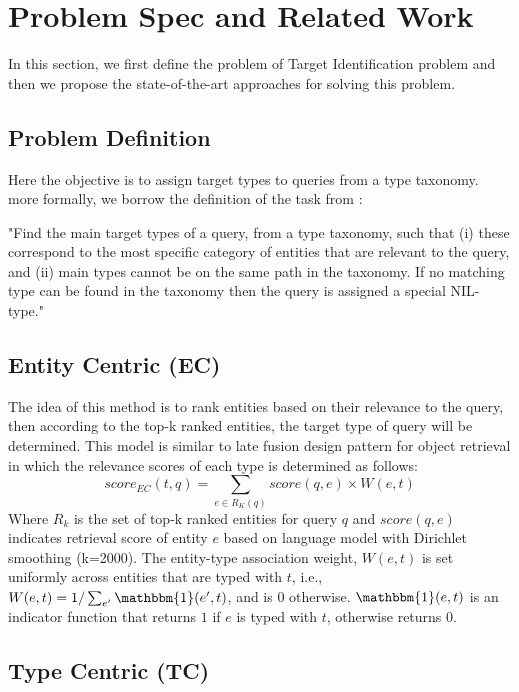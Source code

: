 \section{Problem Spec and Related Work}
In this section, we first define the problem of Target Identification problem and then we propose the state-of-the-art approaches for solving this problem.

\subsection{Problem Definition}
Here the objective is to assign target types to queries from a type taxonomy. more formally, we borrow the definition of the task from \cite{Garigliotti:2017:TTI:3077136.3080659}:

"Find the main target types of a query, from a type taxonomy, such that (i) these correspond to the most specific category of entities that are relevant to the query, and (ii) main types cannot be on the same path in the taxonomy. If no matching type can be found in the taxonomy then the query is assigned a special NIL-type."

\subsection{Entity Centric (EC)}\label{EC}
The idea of this method is to rank entities based on their relevance to the query, then according to the top-k ranked entities, the target type of query will be determined. This model is similar to late fusion design pattern for object retrieval \cite{zhang2017design} in which the relevance scores of each type is determined as follows:
\begin{equation}
score_{EC}(t,q) = \sum_{e\in R_K(q)}{score(q,e)\times W(e,t)}
\end{equation}
Where $R_k$ is the set of top-k ranked entities for query $q$ and $score(q,e)$ indicates retrieval score of entity $e$ based on language model with Dirichlet smoothing (k=2000). The entity-type association weight, $W(e,t)$ is set uniformly across entities that are typed with $t$, i.e., $W(e,t)=1/\sum_{e^\prime}{\mathbbm{1}(e^\prime,t)}$, and is 0 otherwise.
$\mathbbm{1}(e,t)$ is an indicator function that returns $1$ if $e$ is typed with $t$, otherwise returns $0$.


\subsection{Type Centric (TC)} \label{TC}

